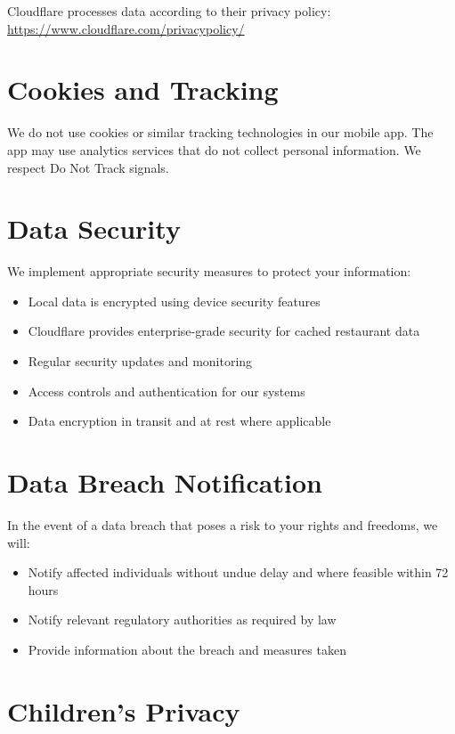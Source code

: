 \documentclass[11pt,letterpaper]{article}
\begin{document}
Cloudflare processes data according to their privacy policy: \url{https://www.cloudflare.com/privacypolicy/}

\section{Cookies and Tracking}

We do not use cookies or similar tracking technologies in our mobile app. The app may use analytics services that do not collect personal information. We respect Do Not Track signals.

\section{Data Security}

We implement appropriate security measures to protect your information:
\begin{itemize}
    \item Local data is encrypted using device security features
    \item Cloudflare provides enterprise-grade security for cached restaurant data
    \item Regular security updates and monitoring
    \item Access controls and authentication for our systems
    \item Data encryption in transit and at rest where applicable
\end{itemize}

\section{Data Breach Notification}

In the event of a data breach that poses a risk to your rights and freedoms, we will:
\begin{itemize}
    \item Notify affected individuals without undue delay and where feasible within 72 hours
    \item Notify relevant regulatory authorities as required by law
    \item Provide information about the breach and measures taken
\end{itemize}

\section{Children's Privacy}
\end{document}

